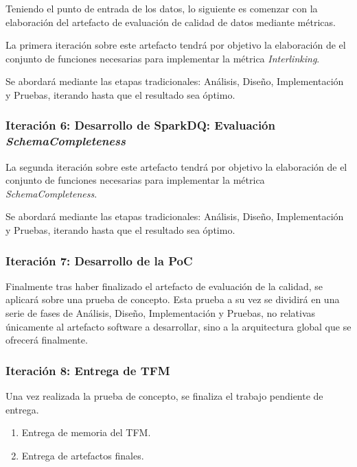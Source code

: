 Teniendo el punto de entrada de los datos, lo siguiente es comenzar con la
elaboración del artefacto de evaluación de calidad de datos mediante
métricas.

La primera iteración sobre este artefacto tendrá por objetivo la elaboración de
el conjunto de funciones necesarias para implementar la métrica
\textit{Interlinking}.

Se abordará mediante las etapas tradicionales: Análisis, Diseño,
Implementación y Pruebas, iterando hasta que el resultado sea óptimo. 



\subsubsection{Iteración 6: Desarrollo de SparkDQ: Evaluación
  \textit{SchemaCompleteness}}


La segunda iteración sobre este artefacto tendrá por objetivo la elaboración de
el conjunto de funciones necesarias para implementar la métrica
\textit{SchemaCompleteness}.

Se abordará mediante las etapas tradicionales: Análisis, Diseño,
Implementación y Pruebas, iterando hasta que el resultado sea óptimo. 



\subsubsection{Iteración 7: Desarrollo de la \acs{PoC}}

Finalmente tras haber finalizado el artefacto de evaluación de la calidad, se
aplicará sobre una prueba de concepto. Esta prueba a su vez se dividirá en una
serie de fases de Análisis, Diseño, Implementación y Pruebas, no relativas
únicamente al artefacto software a desarrollar, sino a la arquitectura global
que se ofrecerá finalmente. 




\subsubsection{Iteración 8: Entrega de \acs{TFM}}

Una vez realizada la prueba de concepto, se finaliza el trabajo pendiente de entrega.

\begin{enumerate}
\item Entrega de memoria del \acs{TFM}.
\item Entrega de artefactos finales.
\end{enumerate}

